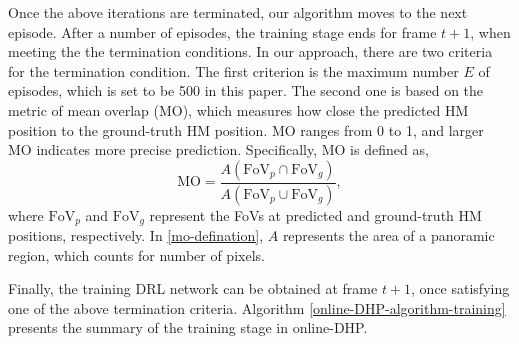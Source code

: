 \documentclass[10pt,journal,compsoc]{IEEEtran}
\begin{document}
%

Once the above iterations are terminated, our algorithm moves to the next episode.
After a number of episodes, the training stage ends for frame $t+1$, when meeting the the termination conditions.
In our approach, there are two criteria for the termination condition. The first criterion is the maximum number $E$ of episodes, which is set to be 500 in this paper.
The second one is based on the metric of mean overlap (MO), which measures how close the predicted HM position to the ground-truth HM position.
MO ranges from 0 to 1, and larger MO indicates more precise prediction.
Specifically, MO is defined as,
\begin{equation}
\label{mo-defination}
\textrm{MO} =\frac{A(\textrm{FoV}_{p} \cap \textrm{FoV}_{g})}{A(\textrm{FoV}_{p} \cup \textrm{FoV}_{g})},
\end{equation}
where $\textrm{FoV}_{p}$ and $\textrm{FoV}_{g}$ represent the FoVs at predicted and ground-truth HM positions, respectively.
In \eqref{mo-defination}, $A$ represents the area of a panoramic region, which counts for number of pixels.

Finally, the training DRL network can be obtained at frame $t+1$, once satisfying one of  the above termination criteria.
Algorithm \ref{online-DHP-algorithm-training} presents the summary of the training stage in online-DHP.
\end{document}
